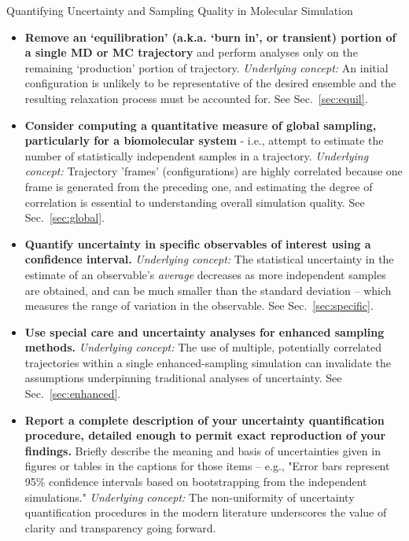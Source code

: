 \begin{Checklists*}[p!]
\begin{checklist}{Quantifying Uncertainty and Sampling Quality in Molecular Simulation}
\begin{itemize}
\item
 \textbf{Remove an ‘equilibration' (a.k.a. `burn in', or transient) portion of a single MD or MC trajectory} and perform analyses only on the remaining ‘production’ portion of trajectory.  \emph{Underlying concept:} An initial configuration is unlikely to be representative of the desired ensemble and the resulting relaxation process must be accounted for.  See Sec.\ \ref{sec:equil}.
 
\item
 \textbf{Consider computing a quantitative measure of global sampling, particularly for a biomolecular system} - i.e., attempt to estimate the number of statistically independent samples in a trajectory.  \emph{Underlying concept:} Trajectory 'frames' (configurations) are highly correlated because one frame is generated from the preceding one, and estimating the degree of correlation is essential to understanding overall simulation quality.  See Sec.\ \ref{sec:global}.
\item
 \textbf{Quantify uncertainty in specific observables of interest using a confidence interval.}  \emph{Underlying concept:} The statistical uncertainty in the estimate of an observable's \emph{average} decreases as more independent samples are obtained, and can be much smaller than the standard deviation -- which measures the range of variation in the observable.  See Sec.\ \ref{sec:specific}.
 
\item
\textbf{Use special care and uncertainty analyses for enhanced sampling methods.}  \emph{Underlying concept:} The use of multiple, potentially correlated trajectories within a single enhanced-sampling simulation can invalidate the assumptions underpinning traditional analyses of uncertainty.  See Sec.\ \ref{sec:enhanced}.

\item
{\color{red}
\textbf{Report a complete description of your uncertainty quantification procedure, detailed enough to permit exact reproduction of your findings.}  
Briefly describe the meaning and basis of uncertainties given in figures or tables in the captions for those items -- e.g., "Error bars represent 95\% confidence intervals based on bootstrapping from the independent simulations."  
\emph{Underlying concept:} The non-uniformity of uncertainty quantification procedures in the modern literature underscores the value of clarity and transparency going forward.
}

\end{itemize}
\end{checklist}
\end{Checklists*}
